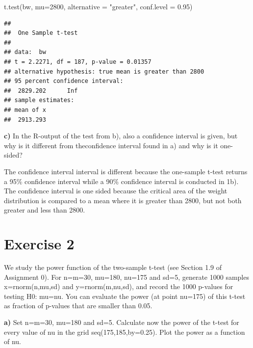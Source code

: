 \documentclass[
]{article}
\newenvironment{Shaded}{\begin{snugshade}}{\end{snugshade}}
\newcommand{\AttributeTok}[1]{\textcolor[rgb]{0.77,0.63,0.00}{#1}}
\newcommand{\DecValTok}[1]{\textcolor[rgb]{0.00,0.00,0.81}{#1}}
\newcommand{\FloatTok}[1]{\textcolor[rgb]{0.00,0.00,0.81}{#1}}
\newcommand{\FunctionTok}[1]{\textcolor[rgb]{0.00,0.00,0.00}{#1}}
\newcommand{\NormalTok}[1]{#1}
\newcommand{\StringTok}[1]{\textcolor[rgb]{0.31,0.60,0.02}{#1}}
\begin{document}
\begin{Shaded}
\begin{Highlighting}[]
\FunctionTok{t.test}\NormalTok{(bw, }\AttributeTok{mu=}\DecValTok{2800}\NormalTok{, }\AttributeTok{alternative =} \StringTok{"greater"}\NormalTok{, }\AttributeTok{conf.level =} \FloatTok{0.95}\NormalTok{)}
\end{Highlighting}
\end{Shaded}

\begin{verbatim}
## 
##  One Sample t-test
## 
## data:  bw
## t = 2.2271, df = 187, p-value = 0.01357
## alternative hypothesis: true mean is greater than 2800
## 95 percent confidence interval:
##  2829.202      Inf
## sample estimates:
## mean of x 
##  2913.293
\end{verbatim}

\textbf{c)} In the R-output of the test from b), also a confidence
interval is given, but why is it different from theconfidence interval
found in a) and why is it one-sided?

The confidence interval interval is different because the one-sample
t-test returns a 95\% confidence interval while a 90\% confidence
interval is conducted in 1b). The confidence interval is one sided
because the critical area of the weight distribution is compared to a
mean where it is greater than 2800, but not both greater and less than
2800.

\hypertarget{exercise-2}{%
\section{Exercise 2}\label{exercise-2}}

We study the power function of the two-sample t-test (see Section 1.9 of
Assignment 0). For n=m=30, mu=180, nu=175 and sd=5, generate 1000
samples x=rnorm(n,mu,sd) and y=rnorm(m,nu,sd), and record the 1000
p-values for testing H0: mu=nu. You can evaluate the power (at point
nu=175) of this t-test as fraction of p-values that are smaller than
0.05.

\textbf{a)} Set n=m=30, mu=180 and sd=5. Calculate now the power of the
t-test for every value of nu in the grid seq(175,185,by=0.25). Plot the
power as a function of nu.
\end{document}
